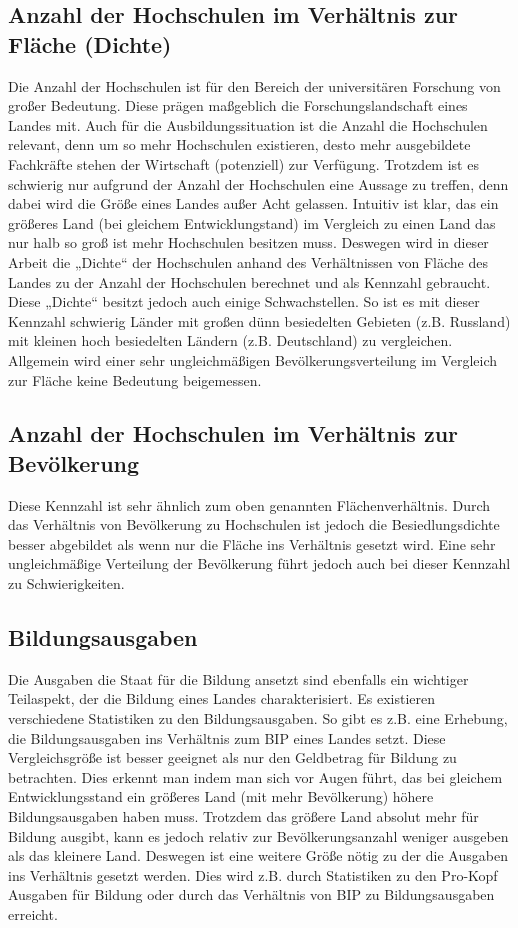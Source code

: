 \subsection{Anzahl der Hochschulen im Verhältnis zur Fläche (Dichte)}
Die Anzahl der Hochschulen ist für den Bereich der universitären Forschung von großer Bedeutung. Diese prägen maßgeblich die Forschungslandschaft eines Landes mit. Auch für die Ausbildungssituation ist die Anzahl die Hochschulen relevant, denn um so mehr Hochschulen existieren, desto mehr ausgebildete Fachkräfte stehen der Wirtschaft (potenziell) zur Verfügung. 
Trotzdem ist es schwierig nur aufgrund der Anzahl der Hochschulen eine Aussage zu treffen, denn dabei wird die Größe eines Landes außer Acht gelassen. Intuitiv ist klar, das ein größeres Land (bei gleichem Entwicklungstand) im Vergleich zu einen Land das nur halb so groß ist mehr Hochschulen besitzen muss. Deswegen wird in dieser Arbeit die „Dichte“ der Hochschulen anhand des Verhältnissen von  Fläche des Landes zu der Anzahl der Hochschulen berechnet und als Kennzahl gebraucht.
Diese „Dichte“ besitzt jedoch auch einige Schwachstellen. So ist es mit dieser Kennzahl schwierig Länder mit großen dünn besiedelten Gebieten (z.B. Russland) mit kleinen hoch besiedelten Ländern (z.B. Deutschland) zu vergleichen. Allgemein wird einer sehr ungleichmäßigen Bevölkerungsverteilung im Vergleich zur Fläche keine Bedeutung beigemessen.

\subsection{Anzahl der Hochschulen im Verhältnis zur Bevölkerung}
Diese Kennzahl ist sehr ähnlich zum oben genannten Flächenverhältnis. Durch das Verhältnis von Bevölkerung zu Hochschulen ist jedoch die Besiedlungsdichte besser abgebildet als wenn nur die Fläche ins Verhältnis gesetzt wird.
Eine sehr ungleichmäßige Verteilung der Bevölkerung führt jedoch auch bei dieser Kennzahl zu Schwierigkeiten.

\subsection{Bildungsausgaben}
Die Ausgaben die Staat für die Bildung ansetzt sind ebenfalls ein wichtiger Teilaspekt, der die Bildung eines Landes charakterisiert.
Es existieren verschiedene Statistiken zu den Bildungsausgaben. So gibt es z.B. eine Erhebung, die Bildungsausgaben ins Verhältnis zum BIP eines Landes setzt. Diese Vergleichsgröße ist besser geeignet als nur den Geldbetrag für Bildung zu betrachten. Dies erkennt man indem man sich vor Augen führt, das bei gleichem Entwicklungsstand ein größeres Land (mit mehr Bevölkerung) höhere Bildungsausgaben haben muss. Trotzdem das größere Land absolut mehr für Bildung ausgibt, kann es jedoch relativ zur Bevölkerungsanzahl weniger ausgeben als das kleinere Land. Deswegen ist eine weitere Größe nötig zu der die Ausgaben ins Verhältnis gesetzt werden. Dies wird z.B. durch Statistiken zu den Pro-Kopf Ausgaben für Bildung oder durch das Verhältnis von BIP zu Bildungsausgaben erreicht.

